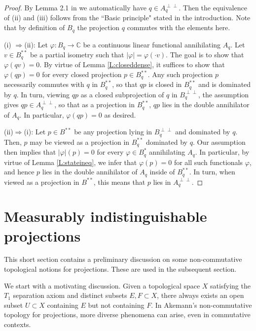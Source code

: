 \documentclass[10pt]{amsart}
\newcommand{\bC}{{\mathbb{C}}}
\renewcommand{\phi}{\varphi}
\theoremstyle{definition}
\begin{document}
\begin{proof}  By Lemma 2.1 in  \cite{blecher2022} we automatically have $q \in A_q^{\perp\perp}$.
Then the  equivalence of  (ii) and (iii)  follows from the
 ``Basic principle" stated in the introduction.  
 Note that by definition of $B_q$ the projection $q$ commutes with the elements here. 

(i) $\Rightarrow$(ii):  
Let $\phi:B_q \to \bC$ be a continuous linear functional annihilating $A_q$.  Let $v\in B_q^{**}$ be a partial isometry such that $|\phi |=\phi(\cdot v)$. The goal is to show that $\phi(qv)=0$.  By virtue of Lemma \ref{L:closeddense}, it suffices to show that $\phi(qp)=0$ for every closed projection $p\in B_q^{**}$. Any such projection $p$ necessarily commutes with $q$ in $B_q^{**}$, so that $qp$ is closed in $B_q^{**}$ \cite[Theorem II.7]{akemann1969} and is dominated by $q$. In turn, viewing $qp$ as a closed subprojection of $q$ in $B_q^{\perp\perp}$, the assumption gives $qp\in A_q^{\perp\perp}$, so that as a projection in $B_q^{**}$, $qp$ lies in the double annihilator of $A_q$. In particular, $\phi(qp)=0$ as desired. 

(ii)$\Rightarrow$(i): Let $p\in B^{**}$ be any projection lying in $B_q^{\perp\perp}$ and dominated by $q$. Then, $p$ may be viewed as a projection in $B_q^{**}$ dominated by $q$. Our assumption then implies that $|\phi|(p)=0$ for every $\phi\in B_q^{*}$ annihilating $A_q$. In particular, by virtue of Lemma \ref{L:stateineq}, we infer that $\phi(p)=0$ for all such functionals $\phi$, and hence $p$ lies in the double annihilator of $A_q$ inside of $B_q^{**}$. In turn, when viewed as a projection in $B^{**}$, this means that $p$ lies in $A_q^{\perp\perp}$. 
 \end{proof} 
 
 






\section{Measurably indistinguishable projections}\label{S:indist}
This short section contains a preliminary discussion on some non-commutative topological notions for  projections. These are used in the subsequent section.

We start with a motivating discussion. Given a topological space $X$ satisfying the $T_1$ separation axiom and distinct subsets $E,F\subset X$, there always exists an open subset $U\subset X$ containing $E$ but not containing $F$. In Akemann's non-commutative topology for projections, more diverse phenomena can arise, even in commutative contexts. 
\end{document}
